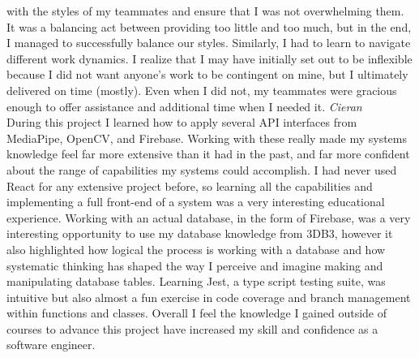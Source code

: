 \documentclass{article}
\begin{document}
with the styles of my teammates and ensure that I was not overwhelming them. It was a balancing act between providing
too little and too much, but in the end, I managed to successfully balance our styles. Similarly, I had to learn to
navigate different work dynamics. I realize that I may have initially set out to be inflexible because
I did not want anyone's work to be contingent on mine, but I ultimately delivered on time (mostly). Even when I
did not, my teammates were gracious enough to offer assistance and additional time when I needed it. 
\newline
\textit{Cieran}\\
During this project I learned how to apply several API interfaces from MediaPipe, OpenCV, and Firebase. Working with these really made my systems knowledge feel far more extensive than it had in the past, and far more confident about the range of capabilities my systems could accomplish. I had never used React for any extensive project before, so learning all the capabilities and implementing a full front-end of a system was a very interesting educational experience. Working with an actual database, in the form of Firebase, was a very interesting opportunity to use my database knowledge from 3DB3, however it also highlighted how logical the process is working with a database and how systematic thinking has shaped the way I perceive and imagine making and manipulating database tables. Learning Jest, a type script testing suite, was intuitive but also almost a fun exercise in code coverage and branch management within functions and classes. Overall I feel the knowledge I gained outside of courses to advance this project have increased my skill and confidence as a software engineer.
\end{document}
